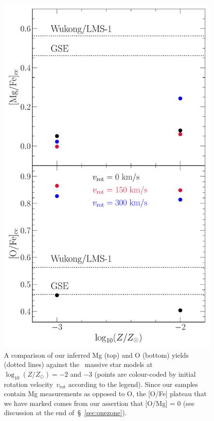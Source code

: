 \documentclass[foo.tex]{subfiles}
\begin{document}
{%
\begin{figure}
\centering
\includegraphics[scale = 0.5]{yield-comparison.pdf}
\caption{
A comparison of our inferred Mg (top) and O (bottom) yields (dotted lines)
against the~\citet{Limongi2018} massive star models
at~$\log_{10}(Z / Z_\odot) = -2$ and $-3$ (points are colour-coded by initial
rotation velocity~$v_\text{rot}$ according to the legend).
Since our samples contain Mg measurements as opposed to O, the [O/Fe] plateau
that we have marked comes from our assertion that [O/Mg] = 0 (see discussion at
the end of~\S~\ref{sec:onezone}).
}
\label{fig:yield-comparison}
\end{figure}

}
\end{document}
